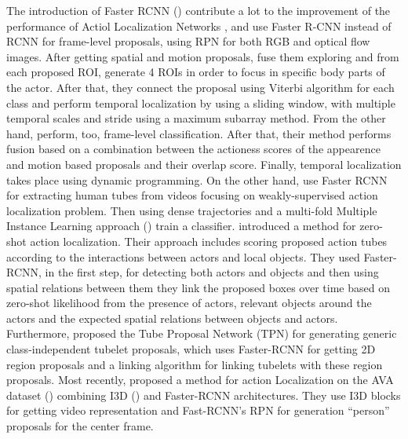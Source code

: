 The introduction of Faster RCNN (\cite{Ren:2015:FRT:2969239.2969250}) contribute a lot to the improvement of the performance of Actiol Localization Networks
\cite{peng:hal-01349107}, \cite{DBLP:journals/corr/SahaSSTC16} and  use Faster R-CNN  instead of RCNN
for frame-level proposals, using RPN for both RGB and optical flow images.
After getting spatial and motion proposals,\cite{peng:hal-01349107} fuse them exploring and from each proposed ROI, generate 4 ROIs in order to focus in specific
body parts of the actor. After that, they connect the proposal using Viterbi algorithm for each class and perform temporal localization by using a sliding window, with multiple
temporal scales and stride using a maximum subarray method. From the other hand, \cite{DBLP:journals/corr/SahaSSTC16} perform, too, frame-level classification. After that,
their method performs fusion based on a combination between the actioness scores of the appearence and motion based proposals and their overlap score. Finally, temporal localization
takes place using dynamic programming. On the other hand, \cite{DBLP:journals/corr/WeinzaepfelMS16} use
Faster RCNN for extracting human tubes from videos focusing  on weakly-supervised action localization problem.
Then using dense trajectories and a  multi-fold Multiple  Instance  Learning approach (\cite{7420739}) train a classifier.
\cite{DBLP:journals/corr/MettesS17} introduced a method for zero-shot action localization. Their approach includes scoring proposed action tubes according to the interactions between
actors and local objects. They used Faster-RCNN, in the first step, for detecting both actors and objects and then using spatial relations between them they link the proposed boxes over
time based on zero-shot likelihood from the presence of actors, relevant objects around the actors and the expected spatial relations between objects and actors.
Furthermore, \cite{DBLP:journals/corr/HeIDM17} proposed the Tube Proposal Network (TPN) for generating generic class-independent tubelet proposals, which uses Faster-RCNN for getting
2D region proposals and a linking algorithm for linking tubelets with these region proposals. Most recently, \cite{DBLP:journals/corr/abs-1807-10066} proposed a method for action Localization
on the AVA dataset (\cite{DBLP:journals/corr/GuSVPRTLRSSM17}) combining I3D (\cite{DBLP:journals/corr/CarreiraZ17}) and Faster-RCNN architectures. They use I3D blocks for getting video representation
and Fast-RCNN's RPN for generation ``person'' proposals for the center frame.
\par

